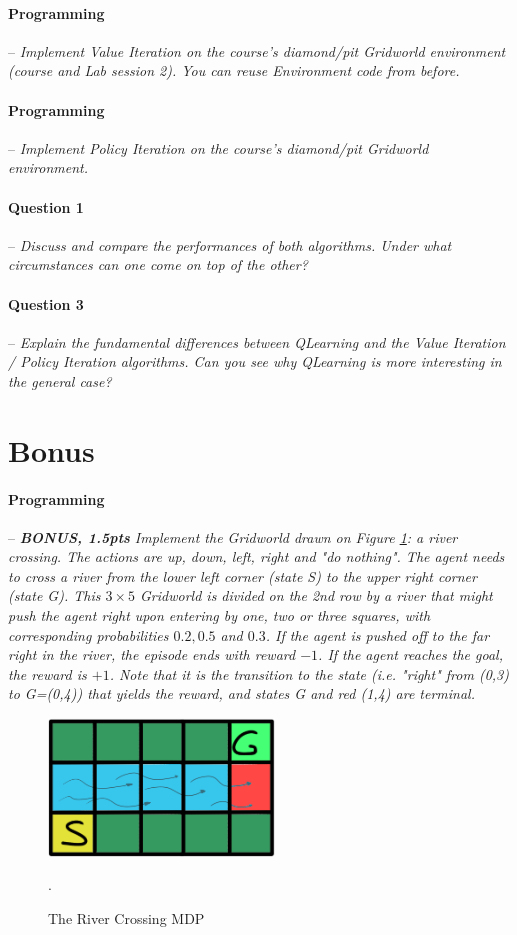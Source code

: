 \documentclass[a4paper]{article}
\newcommand{\question}[2]{
\paragraph{Question #1} -- \textit{#2}

}
\newcommand{\programming}[1]{
\paragraph{Programming} -- \textit{#1}

}
\begin{document}
		\programming{Implement Value Iteration on the course's diamond/pit Gridworld environment (course and Lab session 2). 
				You can reuse Environment code from before.}

		\programming{Implement Policy Iteration on the course's diamond/pit Gridworld environment.}

		\question{1}{Discuss and compare the performances of both algorithms. 
				Under what circumstances can one come on top of the other?}

		\question{3}{Explain the fundamental differences between QLearning and the Value Iteration / Policy Iteration algorithms. 
				Can you see why QLearning is more interesting in the general case?}

	\section{Bonus}
		\programming{\textbf{BONUS, 1.5pts} Implement the Gridworld drawn on Figure \ref{fig:river_crossing}: a river crossing. 
				The actions are up, down, left, right and "do nothing". 
				The agent needs to cross a river from the lower left corner (state S) to the upper right corner (state G). 
				This $3\times 5$ Gridworld is divided on the 2nd row by a river that might push the agent right upon entering by one, two or three squares, with corresponding probabilities $0.2, 0.5$ and $0.3$. 
				If the agent is pushed off to the far right in the river, the episode ends with reward $-1$. 
				If the agent reaches the goal, the reward is $+1$. 
				Note that it is the transition to the state (i.e. "right" from (0,3) to G=(0,4)) that yields the reward, and states G and red (1,4) are terminal.}

		\begin{figure}[H]
			\centering
			\includegraphics[width=6cm]{plots/river.png}
			\caption{The River Crossing MDP}.
			\label{fig:river_crossing}
		\end{figure}{}


	\printbibliography
\end{document}
